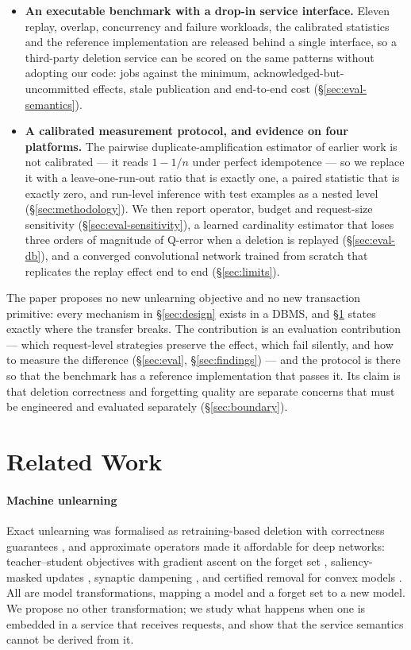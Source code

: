 \documentclass[conference]{IEEEtran}
\begin{document}
\begin{itemize}
\item \textbf{An executable benchmark with a drop-in service interface.}
Eleven replay, overlap, concurrency and failure workloads, the calibrated statistics
and the reference implementation are released behind a single interface, so a
third-party deletion service can be scored on the same patterns without adopting our
code: jobs against the minimum, acknowledged-but-uncommitted effects, stale
publication and end-to-end cost (\S\ref{sec:eval-semantics}).
\item \textbf{A calibrated measurement protocol, and evidence on four platforms.}
The pairwise duplicate-amplification estimator of earlier work is not calibrated --- it
reads $1-1/n$ under perfect idempotence --- so we replace it with a leave-one-run-out
ratio that is exactly one, a paired statistic that is exactly zero, and run-level
inference with test examples as a nested level (\S\ref{sec:methodology}).  We then report
operator, budget and request-size sensitivity (\S\ref{sec:eval-sensitivity}), a learned
cardinality estimator that loses three orders of magnitude of Q-error when a deletion is
replayed (\S\ref{sec:eval-db}), and a converged convolutional network trained from
scratch that replicates the replay effect end to end (\S\ref{sec:limits}).
\end{itemize}

The paper proposes no new unlearning objective and no new transaction primitive: every
mechanism in \S\ref{sec:design} exists in a DBMS, and \S\ref{sec:related} states exactly
where the transfer breaks.  The contribution is an evaluation contribution --- which
request-level strategies preserve the effect, which fail silently, and how to measure the
difference (\S\ref{sec:eval}, \S\ref{sec:findings}) --- and the protocol is there so that the
benchmark has a reference implementation that passes it.  Its claim is that deletion
correctness and forgetting quality are separate concerns that must be engineered and evaluated
separately (\S\ref{sec:boundary}).

\section{Related Work}
\label{sec:related}

\paragraph{Machine unlearning}
Exact unlearning was formalised as retraining-based deletion with correctness guarantees
\cite{cao2015towards,ginart2019making,bourtoule2021machine}, and approximate operators made it
affordable for deep networks: teacher--student objectives with gradient ascent on the forget
set \cite{kurmanji2023unbounded}, saliency-masked updates \cite{fan2024salun}, synaptic
dampening \cite{foster2024fast}, and certified removal for convex models
\cite{sekhari2021remember}.  All are model transformations, mapping a model and a forget set to
a new model.  We propose no other transformation; we study what happens when one is embedded
in a service that receives requests, and show that the service semantics cannot be derived
from it.
\end{document}
